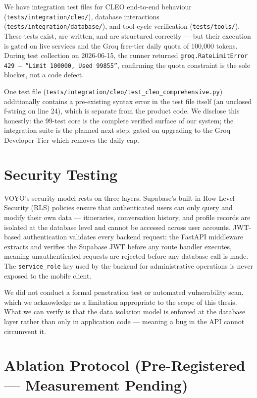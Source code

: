 We have integration test files for CLEO end-to-end behaviour
(\texttt{tests/integration/cleo/}), database interactions
(\texttt{tests/integration/database/}), and tool-cycle verification (\texttt{tests/tools/}). These
tests exist, are written, and are structured correctly — but their execution is gated on live
services and the Groq free-tier daily quota of 100,000 tokens. During test collection on
2026-06-15, the runner returned \texttt{groq.RateLimitError 429 — ``Limit 100000, Used
99855''}, confirming the quota constraint is the sole blocker, not a code defect.

One test file (\texttt{tests/integration/cleo/test\_cleo\_comprehensive.py}) additionally
contains a pre-existing syntax error in the test file itself (an unclosed f-string on line 24),
which is separate from the product code. We disclose this honestly: the 99-test core is the
complete verified surface of our system; the integration suite is the planned next step, gated
on upgrading to the Groq Developer Tier which removes the daily cap.


\section{Security Testing}

VOYO's security model rests on three layers. Supabase's built-in Row Level Security (RLS)
policies ensure that authenticated users can only query and modify their own data —
itineraries, conversation history, and profile records are isolated at the database level and
cannot be accessed across user accounts. JWT-based authentication validates every backend
request: the FastAPI middleware extracts and verifies the Supabase JWT before any route
handler executes, meaning unauthenticated requests are rejected before any database call is
made. The \texttt{service\_role} key used by the backend for administrative operations is never
exposed to the mobile client.

We did not conduct a formal penetration test or automated vulnerability scan, which we
acknowledge as a limitation appropriate to the scope of this thesis. What we can verify is that
the data isolation model is enforced at the database layer rather than only in application code
— meaning a bug in the API cannot circumvent it.


\section{Ablation Protocol (Pre-Registered — Measurement Pending)}

